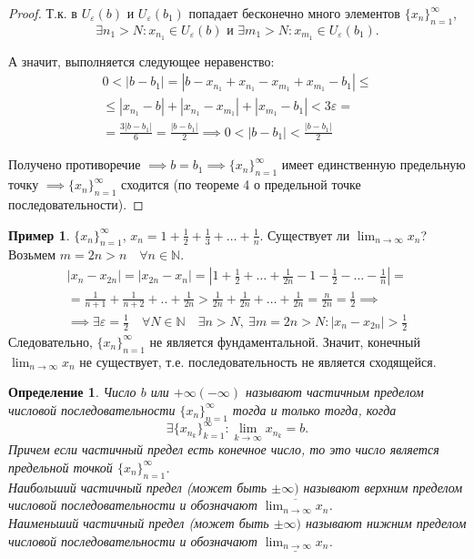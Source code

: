 \documentclass[a4paper,12pt]{article} %
\newtheorem{definition}{Определение}[section]
\theoremstyle{remark}
\theoremstyle{definition}
\newtheorem{exmp}{Пример}[section]
\begin{document}
\begin{proof}
	Т.к. в $U_\varepsilon(b)$ и $U_\varepsilon(b_1)$ попадает бесконечно много элементов $\{x_n\}_{n=1}^{\infty}$,
\[ \exists  n_1>N : x_{n_1} \in  U_\varepsilon(b) \text{ \ и \ } \exists m_1>N : x_{m_1} \in U_\varepsilon(b_1) .\] 

А значит, выполняется следующее неравенство:
\begin{multline}
	0 < |b-b_1| = |b-x_{n_1} + x_{n_1} - x_{m_1} + x_{m_1} - b_1| \le \\
	\le |x_{n_1} - b| + |x_{n_1} - x_{m_1}| + |x_{m_1} - b_1| <3\varepsilon = \\
	= \frac{3|b-b_1|}{6} = \frac{|b-b_1|}{2} \implies 0 < |b-b_1| < \frac{|b-b_1|}{2}
\end{multline}

Получено противоречие $\implies b=b_1 \implies \{x_n\}_{n=1}^{\infty}$ имеет единственную предельную точку $\implies \{x_n\}_{n=1}^{\infty}$ сходится (по теореме 4 о предельной точке последовательности).
\end{proof}

\begin{exmp}
	$\{x_n\}_{n=1}^{\infty}$, $x_{n} = 1 + \frac{1}{2} + \frac{1}{3} + \ldots + \frac{1}{n}$.
    Существует ли $\displaystyle \lim_{n \to \infty} x_n$?
	Возьмем $m = 2n > n \quad \forall n \in  \mathbb{N}$.
	\begin{multline}
		|x_{n} - x_{2n}| = |x_{2n} - x_{n}| = |1 + \frac{1}{2} + \ldots + \frac{1}{2n} - 1 - \frac{1}{2} -\ldots - \frac{1}{n}| = \\
	= \frac{1}{n+1} + \frac{1}{n+2} + .. + \frac{1}{2n} > \frac{1}{2n} + \frac{1}{2n} + \ldots + \frac{1}{2n} = \frac{n}{2n} = \frac{1}{2} \implies \\
	\implies \exists \varepsilon=\frac{1}{2} \quad \forall N\in  \mathbb{N} \quad \exists n>N, \ \exists m=2n>N : |x_{n}-x_{2n}| > \frac{1}{2}
	\end{multline}
	Следовательно, $\{x_n\}_{n=1}^{\infty}$ не является фундаментальной. Значит, конечный $\lim_{n \to \infty} x_n$ не существует, т.е. последовательность не является сходящейся.
\end{exmp}


\begin{definition}
	Число $b$ или $+\infty(-\infty)$ называют частичным пределом числовой последовательности $\{x_n\}_{n=1}^{\infty}$ тогда и только тогда, когда
	\[
		\exists  \{x_{n_k}\}_{k=1}^{\infty} : \lim_{k \to \infty} x_{n_k} = b
	.\] 
	Причем если частичный предел есть конечное число, то это число является предельной точкой $\{x_n\}_{n=1}^{\infty}$. \\
	Наибольший частичный предел (может быть $\pm\infty)$ называют верхним пределом числовой последовательности и обозначают $\overline{\lim_{n \to \infty} x_n}$. \\
	Наименьший частичный предел (может быть $\pm\infty)$ называют нижним пределом числовой последовательности и обозначают $\underline{\lim_{n \to \infty} x_n}$.
\end{definition}
\end{document}
